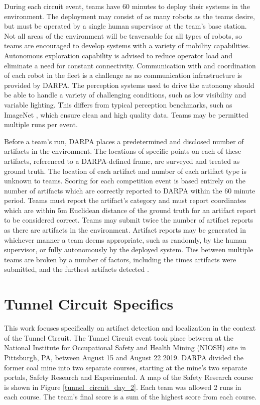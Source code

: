 During each circuit event, teams have 60 minutes to deploy their systems in the environment. The deployment may consist of as many robots as the teams desire, but must be operated by a single human supervisor at the team's base station. Not all areas of the environment will be traversable for all types of robots, so teams are encouraged to develop systems with a variety of mobility capabilities. Autonomous exploration capability is advised to reduce operator load and eliminate a need for constant connectivity. Communication with and coordination of each robot in the fleet is a challenge as no communication infrastructure is provided by DARPA.  The perception systems used to drive the autonomy should be able to handle a variety of challenging conditions, such as low visibility and variable lighting. This differs from typical perception benchmarks, such as ImageNet \cite{deng2009imagenet}, which ensure clean and high quality data. Teams may be permitted multiple runs per event.

Before a team's run, DARPA places a predetermined and disclosed number of artifacts in the environment. The locations of specific points on each of these artifacts, referenced to a DARPA-defined frame, are surveyed and treated as ground truth. The location of each artifact and number of each artifact type is unknown to teams. Scoring for each competition event is based entirely on the number of artifacts which are correctly reported to DARPA within the 60 minute period. Teams must report the artifact's category and must report coordinates which are within 5m Euclidean distance of the ground truth for an artifact report to be considered correct. Teams may submit twice the number of artifact reports as there are artifacts in the environment. Artifact reports may be generated in whichever manner a team deems appropriate, such as randomly, by the human supervisor, or fully autonomously by the deployed system. Ties between multiple teams are broken by a number of factors, including the times artifacts were submitted, and the furthest artifacts detected \cite{tunnel_rules}.

\section{Tunnel Circuit Specifics}

This work focuses specifically on artifact detection and localization in the context of the Tunnel Circuit. The Tunnel Circuit event took place between at the National Institute for Occupational Safety and Health Mining (NIOSH) site in Pittsburgh, PA, between August 15 and August 22 2019. DARPA divided the former coal mine into two separate courses, starting at the mine's two separate portals, Safety Research and Experimental. A map of the Safety Research course is shown in Figure \ref{tunnel_circuit_day_2}. Each team was allowed 2 runs in each course. The team's final score is a sum of the highest score from each course.

